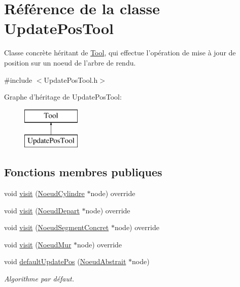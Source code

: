 \hypertarget{class_update_pos_tool}{\section{Référence de la classe Update\-Pos\-Tool}
\label{class_update_pos_tool}
}


Classe concrète héritant de \hyperlink{class_tool}{Tool}, qui effectue l'opération de mise à jour de position sur un noeud de l'arbre de rendu.  




{\ttfamily \#include $<$Update\-Pos\-Tool.\-h$>$}

Graphe d'héritage de Update\-Pos\-Tool\-:\begin{figure}[H]
\begin{center}
\leavevmode
\includegraphics[height=2.000000cm]{class_update_pos_tool}
\end{center}
\end{figure}
\subsection*{Fonctions membres publiques}
\begin{DoxyCompactItemize}
\item 
void \hyperlink{group__inf2990_ga17c74b38bec464d0709cfa524956bc20}{visit} (\hyperlink{class_noeud_cylindre}{Noeud\-Cylindre} $\ast$node) override
\item 
void \hyperlink{group__inf2990_gab2df0415f70228237a770a972d58fecd}{visit} (\hyperlink{class_noeud_depart}{Noeud\-Depart} $\ast$node) override
\item 
void \hyperlink{group__inf2990_ga2c9d682bbe7b343d62a20878e1589a2a}{visit} (\hyperlink{class_noeud_segment_concret}{Noeud\-Segment\-Concret} $\ast$node) override
\item 
void \hyperlink{group__inf2990_ga1314042a9c165f51305697d69b97d2e6}{visit} (\hyperlink{class_noeud_mur}{Noeud\-Mur} $\ast$node) override
\item 
void \hyperlink{group__inf2990_ga272a909a88c8fa8f9f882834fd890398}{default\-Update\-Pos} (\hyperlink{class_noeud_abstrait}{Noeud\-Abstrait} $\ast$node)
\begin{DoxyCompactList}\small\item\em Algorithme par défaut. \end{DoxyCompactList}\end{DoxyCompactItemize}


